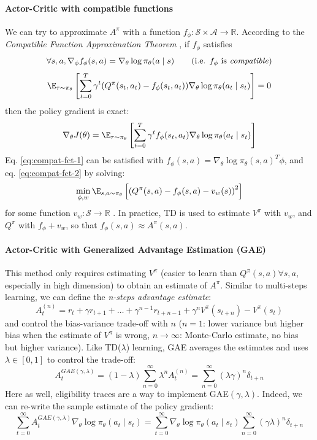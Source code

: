 \paragraph{Actor-Critic with compatible functions}
We can try to approximate $A^\pi$ with a function $f_\phi: \mathcal{S} \times \mathcal{A} \rightarrow \mathbb{R}$. According to the \emph{Compatible Function Approximation Theorem} \cite{sutton2000policy} \demo, if $f_\phi$ satisfies
\begin{equation}
    \forall s, a, \nabla_\phi f_\phi(s,a) = \nabla_\theta \log \pi_\theta(a\mid s)
    \qquad \text{(i.e. $f_\phi$ is \emph{compatible})}
\label{eq:compat-fct-1}
\end{equation}
\begin{equation}
    \E_{\tau \sim \pi_\theta} \left[ \sum_{t=0}^T \gamma^t (Q^\pi(s_t,a_t) - f_\phi(s_t,a_t)) \nabla_\theta \log \pi_\theta(a_t\mid s_t)\right] = 0
\label{eq:compat-fct-2}
\end{equation}
then the policy gradient is exact:
\[
    \nabla_\theta J(\theta) 
    = \E_{\tau \sim \pi_\theta} \left[\sum_{t=0}^T \gamma^t f_\phi(s_t,a_t) \nabla_\theta \log \pi_\theta(a_t \mid  s_t) \right]
\]
Eq. \ref{eq:compat-fct-1} can be satisfied with $f_\phi(s,a) = \nabla_\theta \log \pi_\theta(s,a)^T \phi$, and eq. \ref{eq:compat-fct-2} by solving:
\[
    \min_{\phi, w} \E_{s, a \sim \pi_\theta}\left[
    \left(Q^\pi(s,a) - f_\phi(s,a) - v_w(s)\right)^2
    \right]
\]
for some function $v_w:\mathcal{S} \rightarrow \mathbb{R}$ \demo. In practice, TD is used to estimate $V^\pi$ with $v_w$, and $Q^\pi$ with $f_\phi + v_w$, so that $f_\phi(s,a) \approx A^\pi(s,a)$.

\paragraph{Actor-Critic with Generalized Advantage Estimation (GAE) \cite{schulman2015high}}
This method only requires estimating $V^\pi$ (easier to learn than $Q^\pi(s,a) \forall s,a$, especially in high dimension) to obtain an estimate of $A^\pi$.
Similar to multi-steps learning, we can define the \emph{n-steps advantage estimate}:
\begin{equation}
    A_t^{(n)} = r_t + \gamma r_{t+1} + \dots + \gamma^{n-1} r_{t+n-1} + \gamma^n V^\pi(s_{t+n}) - V^\pi(s_t)
\label{eq:n-steps-advantage}
\end{equation}
and control the bias-variance trade-off with $n$ ($n=1$: lower variance but higher bias when the estimate of $V^\pi$ is wrong, $n\rightarrow \infty$: Monte-Carlo estimate, no bias but higher variance). Like TD($\lambda$) learning, GAE averages the estimates and uses $\lambda \in [0,1]$ to control the trade-off:
\[
    A_t^{GAE(\gamma,\lambda)} = (1-\lambda) \sum_{n=0}^\infty \lambda^n A_t^{(n)} = \sum_{n=0}^\infty (\lambda \gamma)^n \delta_{t+n}
\]
Here as well, eligibility traces are a way to implement GAE$(\gamma,\lambda)$. Indeed, we can re-write the sample estimate of the policy gradient:
\[
    \sum_{t=0}^\infty A_t^{GAE(\gamma,\lambda)} \nabla_\theta \log \pi_\theta(a_t \mid  s_t)
    = \sum_{t=0}^\infty \nabla_\theta \log \pi_\theta(a_t \mid  s_t) \sum_{n=0}^\infty (\gamma \lambda)^n \delta_{t+n}
\]

